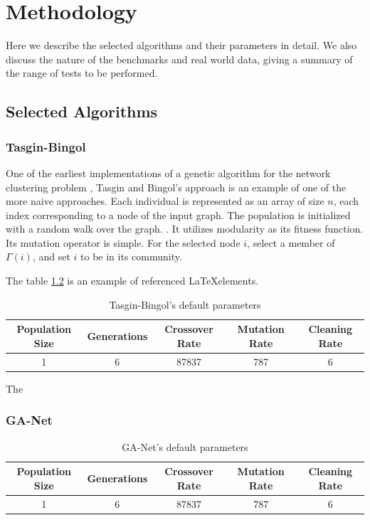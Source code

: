 \chapter{Methodology}
Here we describe the selected algorithms and their parameters in detail. We also discuss the nature of the benchmarks and real world data, giving a summary of the range of tests to be performed. 

\section{Selected Algorithms}
\subsection{Tasgin-Bingol}
One of the earliest implementations of a genetic algorithm for the network clustering problem \cite{Tasgin2006}, Tasgin and Bingol's approach is an example of one of the more naive approaches. Each individual is represented as an array of size $n$, each index corresponding to a node of the input graph. The population is initialized with a random walk over the graph. . It utilizes modularity as its fitness function. Its mutation operator is simple. For the selected node $i$, select a member of $\Gamma(i)$, and set $i$ to be in its community.

The table \ref{table:1} is an example of referenced \LaTeX elements.

\begin{table}[h!]
	\centering
	\begin{tabular}{| c | c | c | c | c |}
		\hline
		Population Size & Generations & Crossover Rate & Mutation Rate  & Cleaning Rate \\ [0.5ex] 
		\hline
		1 & 6 & 87837 & 787 & 6  \\ 

		\hline
	\end{tabular}
	\caption{Tasgin-Bingol's default parameters}
	\label{table:1}
\end{table}

The



\subsection{GA-Net}


\cite{Pizzuti2008}
\begin{table}[h!]
	\centering
	\begin{tabular}{| c | c | c | c | c |}
		\hline
		Population Size & Generations & Crossover Rate & Mutation Rate  & Cleaning Rate \\ [0.5ex] 
		\hline
		1 & 6 & 87837 & 787 & 6  \\ 
		
		\hline
	\end{tabular}
	\caption{GA-Net's default parameters}
	\label{table:1}
\end{table}


